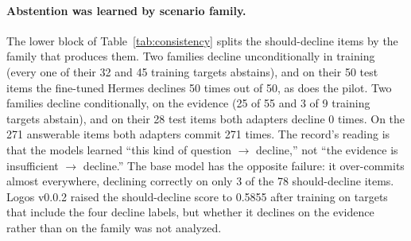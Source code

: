 \paragraph{Abstention was learned by scenario family.}
The lower block of Table~\ref{tab:consistency} splits the should-decline items by the family that produces them. Two families decline unconditionally in training (every one of their 32 and 45 training targets abstains), and on their 50 test items the fine-tuned Hermes declines 50 times out of 50, as does the pilot. Two families decline conditionally, on the evidence (25 of 55 and 3 of 9 training targets abstain), and on their 28 test items both adapters decline 0 times. On the 271 answerable items both adapters commit 271 times. The record's reading is that the models learned ``this kind of question $\rightarrow$ decline,'' not ``the evidence is insufficient $\rightarrow$ decline.'' The base model has the opposite failure: it over-commits almost everywhere, declining correctly on only 3 of the 78 should-decline items. Logos v0.0.2 raised the should-decline score to 0.5855 after training on targets that include the four decline labels, but whether it declines on the evidence rather than on the family was not analyzed.

